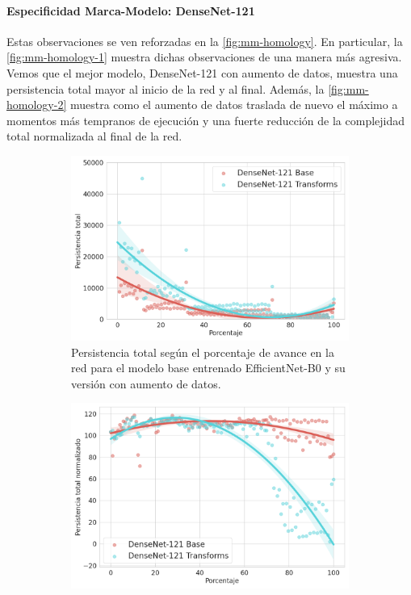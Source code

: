 \paragraph{Especificidad Marca-Modelo: DenseNet-121}

Estas observaciones se ven reforzadas en la \autoref{fig:mm-homology}. En particular,
la \autoref{fig:mm-homology-1} muestra dichas observaciones de una manera más
agresiva. Vemos que el mejor modelo, DenseNet-121 con aumento de datos, muestra una
persistencia total mayor al inicio de la red y al final. Además, la \autoref{fig:mm-homology-2}
muestra como el aumento de datos traslada de nuevo el máximo a momentos más tempranos
de ejecución y una fuerte reducción de la complejidad total normalizada al final
de la red.

\begin{figure}[H]
	\centering
	\begin{subfigure}
		{.5\textwidth}
		\centering
		\includegraphics[width=\linewidth]{img/mm.png}
		\caption{Persistencia total según el porcentaje de avance en la red para el
			modelo base entrenado EfficientNet-B0 y su versión con aumento de datos.}
		\label{fig:mm-homology-1}
	\end{subfigure}%
	\begin{subfigure}
		{.5\textwidth}
		\centering
		\includegraphics[width=\linewidth]{img/mm_norm.png}

\end{subfigure}
\end{figure}
